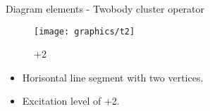 \begin{frame}{Diagram elements - Twobody cluster operator}

    \renewcommand{\figurename}{Level}

    \begin{figure}
    \centering
    \parbox{0.20\textwidth}{
            \centering
            \texttt{[image: graphics/t2]}
            \caption{+2}
        }
    \end{figure}

    \begin{itemize}
        \item Horisontal line segment with two vertices.
        \item Excitation level of +2.
    \end{itemize}
\end{frame}

    
